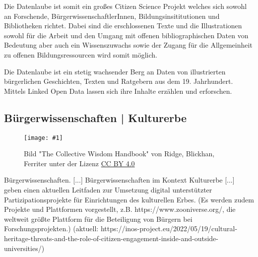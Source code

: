 \documentclass{article}
\newlength{\imgwidth}
\newcommand\scaledgraphics[2]{%
                
\settowidth{\imgwidth}{\texttt{[image: \#1]}}%
                
\setlength{\imgwidth}{\minof{\imgwidth}{#2\textwidth}}%
                
\texttt{[image: \#1]}%
                
}
\begin{document}
Die Datenlaube ist somit ein großes Citizen Science Projekt welches sich sowohl an Forschende, BürgerwissenschaftlerInnen, Bildungsinsititutionen und Bibliotheken richtet. Dabei sind die erschlossenen Texte und die Illustrationen sowohl für die Arbeit und den Umgang mit offenen bibliographischen Daten von Bedeutung aber auch ein Wissenszuwachs sowie der Zugang für die Allgemeinheit zu offenen Bildungsressourcen wird somit möglich.


Die Datenlaube ist ein stetig wachsender Berg an Daten von illustrierten bürgerlichen Geschichten, Texten und Ratgebern aus dem 19. Jahrhundert.  Mittels Linked Open Data lassen sich ihre Inhalte erzählen und erforschen.


\subsection{Bürgerwissenschaften | Kulturerbe}\label{H606719}


\begin{wrapfigure}{r}{0.5\textwidth}
\scaledgraphics{5145f690-0f75-45bf-8ed8-6957d63c6a36.jpg}{0.5}
\caption*{Bild "The Collective Wisdom Handbook" von Ridge, Blickhan, Ferriter unter der Lizenz \href{https://creativecommons.org/licenses/by/4.0/deed.de}{CC BY 4.0}}\label{F4035201}
\end{wrapfigure}


Bürgerwissenschaften. [...] Bürgerwissenschaften im Kontext Kulturerbe [...] \autocite{ridge_collective_2021} geben einen aktuellen Leitfaden zur Umsetzung digital unterstützter Partizipationsprojekte für Einrichtungen des kulturellen Erbes. (Es werden zudem Projekte und Plattformen vorgestellt, z.B. https://www.zooniverse.org/, die weltweit größte Plattform für die Beteiligung von Bürgern bei Forschungsprojekten.) (aktuell: https://inos-project.eu/2022/05/19/cultural-heritage-threats-and-the-role-of-citizen-engagement-inside-and-outside-universities/) 


\printbibliography[title={Literaturverzeichnis}]
\end{document}
